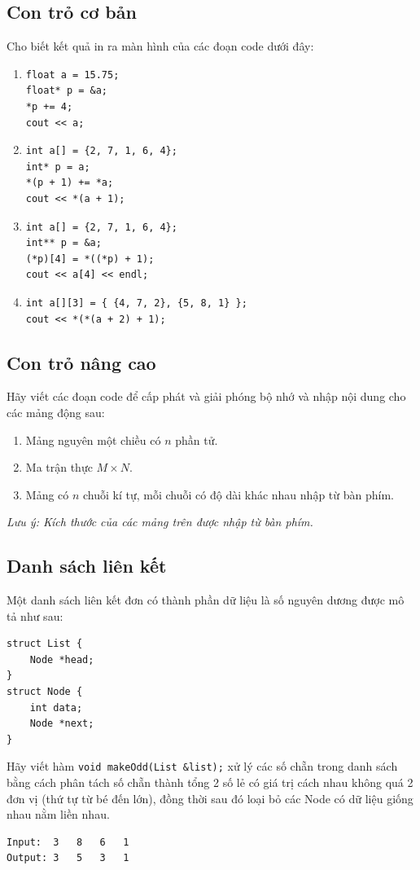 \documentclass[main.tex]{subfiles}
\begin{document}
\subsection{Con trỏ cơ bản}
Cho biết kết quả in ra màn hình của các đoạn code dưới đây:
\begin{enumerate}
    \item \begin{verbatim}
float a = 15.75;
float* p = &a;
*p += 4;
cout << a;
\end{verbatim}
    \item \begin{verbatim}
int a[] = {2, 7, 1, 6, 4};
int* p = a;
*(p + 1) += *a;
cout << *(a + 1);
\end{verbatim}
    \item \begin{verbatim}
int a[] = {2, 7, 1, 6, 4};
int** p = &a;
(*p)[4] = *((*p) + 1);
cout << a[4] << endl;
\end{verbatim}
    \item \begin{verbatim}
int a[][3] = { {4, 7, 2}, {5, 8, 1} };
cout << *(*(a + 2) + 1);
\end{verbatim}
\end{enumerate}
\subsection{Con trỏ nâng cao}
Hãy viết các đoạn code để cấp phát và giải phóng bộ nhớ và nhập nội dung cho các mảng động sau:
\begin{enumerate}[label=\alph*.]
    \item Mảng nguyên một chiều có $n$ phần tử. 
    \item Ma trận thực $M\times N$.
    \item Mảng có $n$ chuỗi kí tự, mỗi chuỗi có độ dài khác nhau nhập từ bàn phím.
\end{enumerate}
\textit{Lưu ý: Kích thước của các mảng trên được nhập từ bàn phím.
}
\subsection{Danh sách liên kết}
Một danh sách liên kết đơn có thành phần dữ liệu là số nguyên dương được mô tả như sau:
\begin{verbatim}
struct List {
    Node *head;
}
struct Node {
    int data;
    Node *next;
}
\end{verbatim}
Hãy viết hàm \texttt{void makeOdd(List &list);} xử lý các số chẵn trong danh sách bằng cách phân tách số chẵn thành tổng 2 số lẻ có giá trị cách nhau không quá 2 đơn vị (thứ tự từ bé đến lớn), đồng thời sau đó loại bỏ các Node có dữ liệu giống nhau nằm liền nhau.
\begin{verbatim}
Input:  3   8   6   1
Output: 3   5   3   1
\end{verbatim}
\end{document}
